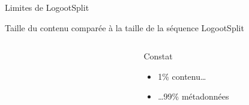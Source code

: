 \begin{frame}{Limites de LogootSplit}
    \begin{block}{Taille du contenu comparée à la taille de la séquence LogootSplit}
        \begin{columns}
            \begin{column}{0.6\textwidth}
                \begin{figure}
                \end{figure}
            \end{column}
            \begin{column}{0.4\textwidth}
                \pause
                \begin{block}{Constat}
                    \begin{itemize}
                        \item 1\% contenu\dots
                        \item \dots 99\% métadonnées
                    \end{itemize}
                \end{block}
                \pause
                \begin{center}

\end{center}
\end{column}
\end{columns}
\end{block}
\end{frame}
